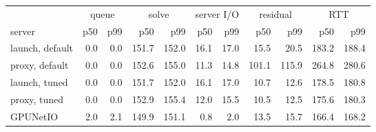 \begin{tabular}{lrrrrrrrrrr}\toprule
 & \multicolumn{2}{c}{queue} & \multicolumn{2}{c}{solve} & \multicolumn{2}{c}{server I/O} & \multicolumn{2}{c}{residual} & \multicolumn{2}{c}{RTT} \\
\cmidrule(lr){2-3}\cmidrule(lr){4-5}\cmidrule(lr){6-7}\cmidrule(lr){8-9}\cmidrule(lr){10-11}
server & p50 & p99 & p50 & p99 & p50 & p99 & p50 & p99 & p50 & p99 \\ \midrule
launch, default & 0.0 & 0.0 & 151.7 & 152.0 & 16.1 & 17.0 & 15.5 & 20.5 & 183.2 & 188.4 \\
proxy, default & 0.0 & 0.0 & 152.6 & 155.0 & 11.3 & 14.8 & 101.1 & 115.9 & 264.8 & 280.6 \\
launch, tuned & 0.0 & 0.0 & 151.7 & 152.0 & 16.1 & 17.0 & 10.7 & 12.6 & 178.5 & 180.8 \\
proxy, tuned & 0.0 & 0.0 & 152.9 & 155.4 & 12.0 & 15.5 & 10.5 & 12.5 & 175.6 & 180.3 \\
GPUNetIO & 2.0 & 2.1 & 149.9 & 151.1 & 0.8 & 2.0 & 13.5 & 15.7 & 166.4 & 168.2 \\
\bottomrule\end{tabular}
